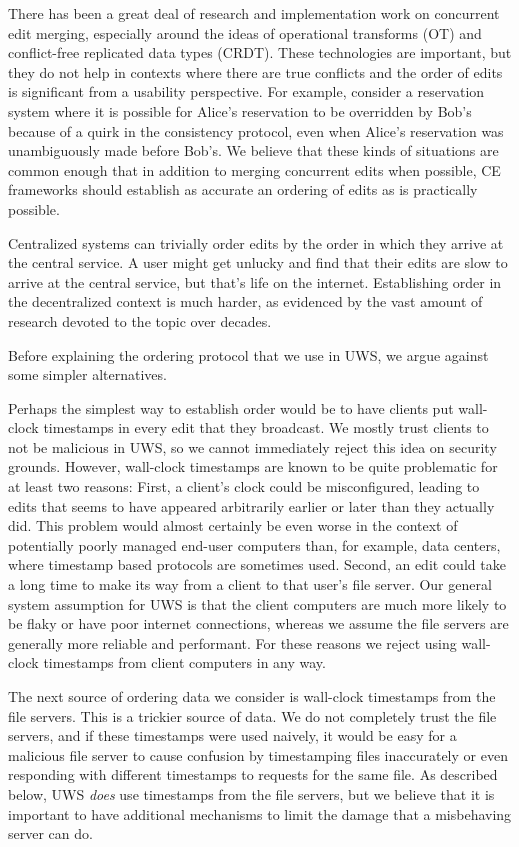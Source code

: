 \documentclass{article}
\begin{document}
There has been a great deal of research and implementation work on concurrent edit merging, especially around the ideas of operational transforms (OT) and conflict-free replicated data types (CRDT).
These technologies are important, but they do not help in contexts where there are true conflicts and the order of edits is significant from a usability perspective.
For example, consider a reservation system where it is possible for Alice's reservation to be overridden by Bob's because of a quirk in the consistency protocol, even when Alice's reservation was unambiguously made before Bob's.
We believe that these kinds of situations are common enough that in addition to merging concurrent edits when possible, CE frameworks should establish as accurate an ordering of edits as is practically possible.

Centralized systems can trivially order edits by the order in which they arrive at the central service.
A user might get unlucky and find that their edits are slow to arrive at the central service, but that's life on the internet.
Establishing order in the decentralized context is much harder, as evidenced by the vast amount of research devoted to the topic over decades.

Before explaining the ordering protocol that we use in UWS, we argue against some simpler alternatives.

Perhaps the simplest way to establish order would be to have clients put wall-clock timestamps in every edit that they broadcast.
We mostly trust clients to not be malicious in UWS, so we cannot immediately reject this idea on security grounds.
However, wall-clock timestamps are known to be quite problematic for at least two reasons:
First, a client's clock could be misconfigured, leading to edits that seems to have appeared arbitrarily earlier or later than they actually did.
This problem would almost certainly be even worse in the context of potentially poorly managed end-user computers than, for example, data centers, where timestamp based protocols are sometimes used.
Second, an edit could take a long time to make its way from a client to that user's file server.
Our general system assumption for UWS is that the client computers are much more likely to be flaky or have poor internet connections, whereas we assume the file servers are generally more reliable and performant.
For these reasons we reject using wall-clock timestamps from client computers in any way.

The next source of ordering data we consider is wall-clock timestamps from the file servers.
This is a trickier source of data.
We do not completely trust the file servers, and if these timestamps were used naively, it would be easy for a malicious file server to cause confusion by timestamping files inaccurately or even responding with different timestamps to requests for the same file.
As described below, UWS \emph{does} use timestamps from the file servers, but we believe that it is important to have additional mechanisms to limit the damage that a misbehaving server can do.
\end{document}
